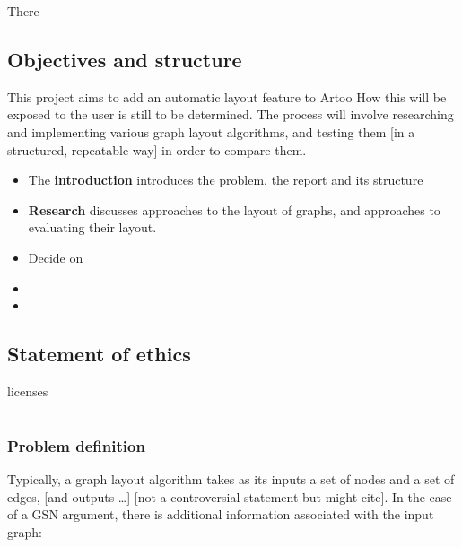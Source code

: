 There 


\section{Objectives and structure}

This project aims to add an automatic layout feature to Artoo
How this will be exposed to the user is still to be determined. 
The process will involve researching and implementing various graph layout algorithms,
and testing them [in a structured, repeatable way] in order to compare them. 

\begin{itemize}
\item The \textbf{introduction} introduces the problem, the report and its structure
\item \textbf{Research} discusses approaches to the layout of graphs, and approaches to evaluating their layout.
\item Decide on
\item
\item
\end{itemize}

\section{Statement of ethics}

licenses


\chapter{}

\subsection{Problem definition}

Typically, a graph layout algorithm takes as its inputs a set of nodes and a set of edges, [and outputs \ldots] [not a controversial statement but might cite].
In the case of a GSN argument, there is additional information associated with the input graph:

